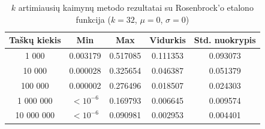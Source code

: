 \begin{table}[H]
    \centering
    \begin{tabular}{|c|c|c|c|c|}
        \hline
        \textbf{Taškų kiekis} & \textbf{Min} & \textbf{Max} & \textbf{Vidurkis} & \textbf{Std. nuokrypis} \\ \hline
        1 000        & 0.003179 & 0.517085 & 0.111353 & 0.093073 \\ \hline
        10 000       & 0.000028 & 0.325654 & 0.046387 & 0.051379 \\ \hline
        100 000      & 0.000002 & 0.276496 & 0.018507 & 0.024303 \\ \hline
        1 000 000    & $<10^{-6}$ & 0.169793 & 0.006645 & 0.009574 \\ \hline
        10 000 000   & $<10^{-6}$ & 0.090981 & 0.002953 & 0.004401 \\ \hline
    \end{tabular}
    \caption{$k$ artimiausių kaimynų metodo rezultatai su Rosenbrock'o etalono funkcija ($k = 32$, $\mu = 0$, $\sigma = 0$)}
\end{table}